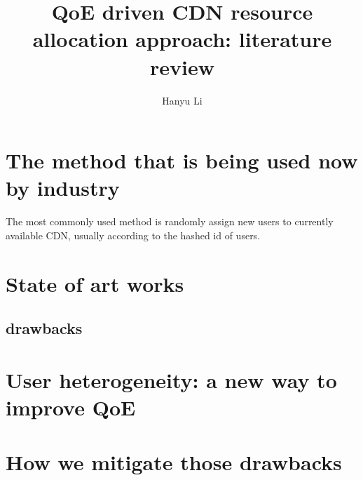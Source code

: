 \documentclass{ctexart}
\title{QoE driven CDN resource allocation approach: literature review}
\author{Hanyu Li}
\begin{document}
\maketitle
\section{The method that is being used now by industry}
The most commonly used method is randomly assign new users to currently available CDN, usually according to the hashed id of users. 
\section{State of art works}
\subsection{drawbacks}
\section{User heterogeneity: a new way to improve QoE}
\section{How we mitigate those drawbacks}


\nocite{*}


\end{document}
